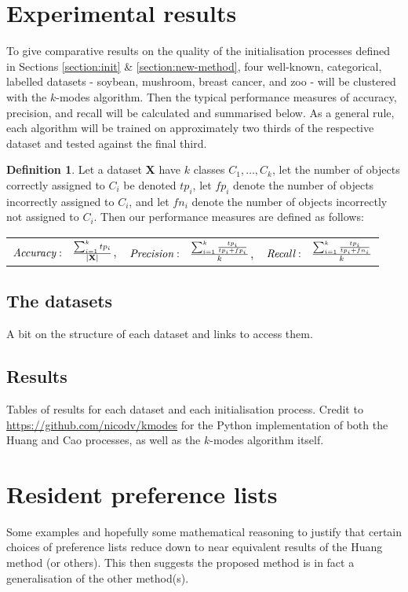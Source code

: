 \documentclass{article}
\theoremstyle{definition}
\newtheorem{definition}{Definition}[section]
\begin{document}
\section{Experimental results}\label{section:results}

To give comparative results on the quality of the initialisation processes defined in Sections \ref{section:init} \& \ref{section:new-method}, four well-known, categorical, labelled datasets - soybean, mushroom, breast cancer, and zoo - will be clustered with the $k$-modes algorithm. Then the typical performance measures of accuracy, precision, and recall will be calculated and summarised below. As a general rule, each algorithm will be trained on approximately two thirds of the respective dataset and tested against the final third.

\begin{definition}
	Let a dataset \textbf{X} have $k$ classes $C_1, \ldots, C_k$, let the number of objects correctly assigned to $C_i$ be denoted $tp_i$, let $fp_i$ denote the number of objects incorrectly assigned to $C_i$, and let $fn_i$ denote the number of objects incorrectly not assigned to $C_i$. Then our performance measures are defined as follows: \\
		
		\centering
		\begin{tabular}{ccc}
			$\emph{Accuracy}: \ \ \frac{\sum_{i=1}^{k}{tp_i}}{|\textbf{X}|}$, &
			
			$\emph{Precision}: \ \ \frac{\sum_{i=1}^{k} \frac{tp_i}{tp_i + fp_i}}{k}$, &
			
			$\emph{Recall}: \ \ \frac{\sum_{i=1}^{k} \frac{tp_i}{tp_i + fn_i}}{k}$ \\
		\end{tabular}
\end{definition}


\subsection{The datasets}\label{subsection:datasets}

A bit on the structure of each dataset and links to access them.


\subsection{Results}\label{subsection:results}

Tables of results for each dataset and each initialisation process. Credit to \url{https://github.com/nicodv/kmodes} for the Python implementation of both the Huang and Cao processes, as well as the $k$-modes algorithm itself.

\section{Resident preference lists}\label{section:preferences}

Some examples and hopefully some mathematical reasoning to justify that certain choices of preference lists reduce down to near equivalent results of the Huang method (or others). This then suggests the proposed method is in fact a generalisation of the other method(s).


\printbibliography
\end{document}
